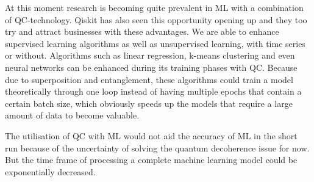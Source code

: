 At this moment research is becoming quite prevalent in ML with a combination of QC-technology. Qiskit has also seen this opportunity opening up and they too try and attract businesses with these advantages. We are able to enhance supervised learning algorithms as well as unsupervised learning, with time series or without. Algorithms such as linear regression, k-means clustering and even neural networks can be enhanced during its training phases with QC. Because due to superposition and entanglement, these algorithms could train a model theoretically through one loop instead of having multiple epochs that contain a certain batch size, which obviously speeds up the models that require a large amount of data to become valuable.

The utilisation of QC with ML would not aid the accuracy of ML in the short run because of the uncertainty of solving the quantum decoherence issue for now. But the time frame of processing a complete machine learning model could be exponentially decreased.





